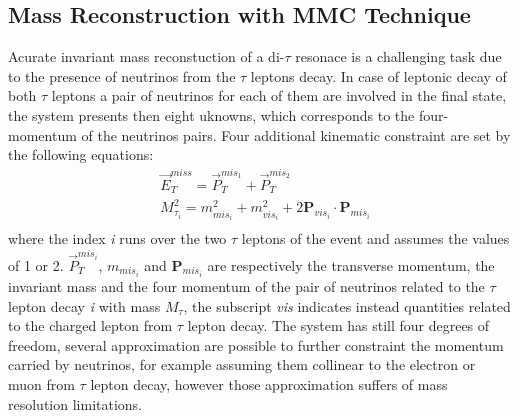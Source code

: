 \subsection{Mass Reconstruction with MMC Technique}\label{sec:mmc}

Acurate invariant mass reconstuction of a di-$\tau$ resonace is a challenging task
due to the presence of neutrinos from the $\tau$ leptons decay. 
In case of leptonic decay of both $\tau$ leptons a pair of neutrinos for each
of them are involved in the final state,  the system presents then eight uknowns, which corresponds to the four-momentum of the neutrinos pairs.
Four additional kinematic constraint are set by the following equations:
\begin{equation} \label{eq:MMC}
\begin{split}
&\vec{E}_T^{miss} = \vec{P}_{T}^{mis_{1}} +  \vec{P}_{T}^{mis_2} \\
&M_{\tau_{i}}^2 = m^2_{mis_{i}} + m^2_{vis_{i}} + 2 \mathbf{P}_{vis_i} \cdot \mathbf{P}_{mis_i} \\
\end{split}
\end{equation}
where the index \emph{i} runs over the two $\tau$ leptons of the event and assumes the values of 1 or 2. 
$\vec{P}_{T}^{mis_{i}}$, $m_{mis_{i}}$ and $\mathbf{P}_{mis_{i}}$ are respectively the transverse momentum, the invariant mass and 
the four momentum of the pair of neutrinos related to the  $\tau$ lepton decay \emph{i} with mass $M_{\tau}$, the subscript \emph{vis} indicates instead 
quantities related to the charged lepton from  $\tau$ lepton decay. The system has still four degrees of freedom,
several approximation are possible to further constraint the momentum carried by neutrinos,
for example assuming them collinear to the electron or muon from $\tau$ lepton decay, however those approximation 
suffers of mass resolution limitations.

